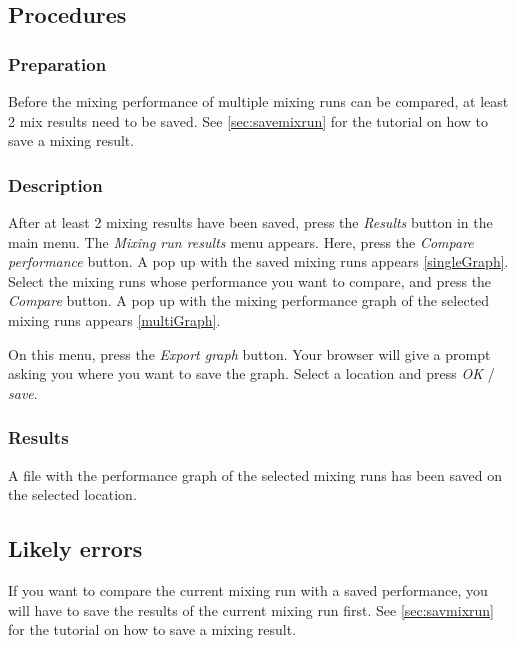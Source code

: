 \subsection{Procedures}
\subsubsection{Preparation}
Before the mixing performance of multiple mixing runs can be compared, at least 2 mix results need to be saved. See \ref{sec:savemixrun} for the tutorial on how to save a mixing result.

\subsubsection{Description}
After at least 2 mixing results have been saved, press the \emph{Results} button in the main menu. The \emph{Mixing run results} menu appears. Here, press the \emph{Compare performance} button. A pop up with the saved mixing runs appears \ref{singleGraph}. Select the mixing runs whose performance you want to compare, and press the \emph{Compare} button.  A pop up with the mixing performance graph of the selected mixing runs appears \ref{multiGraph}.


On this menu, press the \emph{Export graph} button. Your browser will give a prompt asking you where you want to save the graph. Select a location and press \emph{OK} / \emph{save}.

\subsubsection{Results}
A file with the performance graph of the selected mixing runs has been saved on the selected location.

\subsection{Likely errors}
If you want to compare the current mixing run with a saved performance, you will have to save the results of the current mixing run first. See \ref{sec:savmixrun} for the tutorial on how to save a mixing result.


